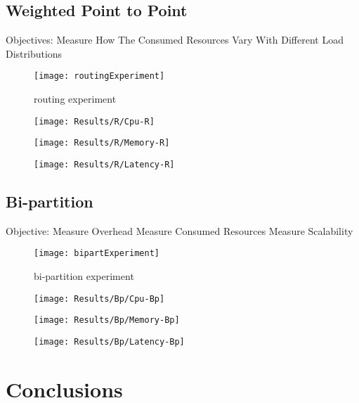 \newpage


\subsection{Weighted Point to Point} %
\label{sec:weighted point to point}

Objectives:
Measure How The Consumed Resources Vary With Different Load Distributions

\begin{figure}[htbp]
    \centering
    \texttt{[image: routingExperiment]}
    \caption{routing experiment}
    \label{fig:gantt}
\end{figure}

\begin{figure}[htbp]
    \centering
    \texttt{[image: Results/R/Cpu-R]}
    \label{fig:gantt}
\end{figure}

\begin{figure}[htbp]
    \centering
    \texttt{[image: Results/R/Memory-R]}
    \label{fig:gantt}
\end{figure}

\begin{figure}[htbp]
    \centering
    \texttt{[image: Results/R/Latency-R]}
    \label{fig:gantt}
\end{figure}

\newpage



\subsection{Bi-partition} %
\label{sec:bi-partition}

Objective:
Measure Overhead
Measure Consumed Resources
Measure Scalability

\begin{figure}[htbp]
    \centering
    \texttt{[image: bipartExperiment]}
    \caption{bi-partition experiment}
    \label{fig:gantt}
\end{figure}

\begin{figure}[htbp]
    \centering
    \texttt{[image: Results/Bp/Cpu-Bp]}
    \label{fig:gantt}
\end{figure}

\begin{figure}[htbp]
    \centering
    \texttt{[image: Results/Bp/Memory-Bp]}
    \label{fig:gantt}
\end{figure}

\begin{figure}[htbp]
    \centering
    \texttt{[image: Results/Bp/Latency-Bp]}
    \label{fig:gantt}
\end{figure}

\section{Conclusions} %
\label{sec:conclusions}